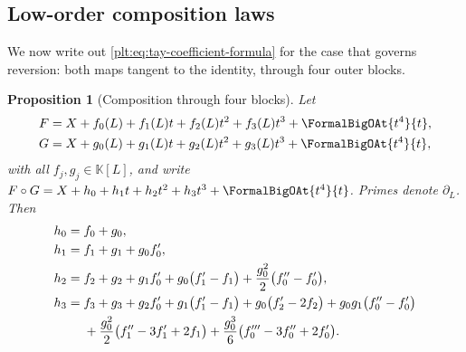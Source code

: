 \documentclass[11pt,oneside]{article}
\theoremstyle{plain}
\newtheorem{proposition}[theorem]{Proposition}
\theoremstyle{definition}
\theoremstyle{remark}
\newcommand{\K}{\mathbb{K}}
\newcommand{\compose}{\mathbin{\circ}}
\begin{document}
\subsection{Low-order composition laws}
\label{plt:sec:tay-low-order}

We now write out \eqref{plt:eq:tay-coefficient-formula} for the case that
governs reversion: both maps tangent to the identity, through four outer
blocks.

\begin{proposition}[Composition through four blocks]
\label{plt:prop:tay-four-blocks}
Let
\begin{align}
 F&=X+f_{0}(L)+f_{1}(L)t+f_{2}(L)t^{2}+f_{3}(L)t^{3}
    +\FormalBigOAt{t^{4}}{t},
 \label{plt:eq:tay-F-blocks}\\
 G&=X+g_{0}(L)+g_{1}(L)t+g_{2}(L)t^{2}+g_{3}(L)t^{3}
    +\FormalBigOAt{t^{4}}{t},
 \label{plt:eq:tay-G-blocks}
\end{align}
with all \(f_{j},g_{j}\in\K[L]\), and write
\(F\compose G=X+h_{0}+h_{1}t+h_{2}t^{2}+h_{3}t^{3}+\FormalBigOAt{t^{4}}{t}\).
Primes denote \(\partial_L\).  Then
\begin{align}
 h_{0}={}&f_{0}+g_{0},\label{plt:eq:tay-h0}\\
 h_{1}={}&f_{1}+g_{1}+g_{0}f_{0}',\label{plt:eq:tay-h1}\\
 h_{2}={}&f_{2}+g_{2}+g_{1}f_{0}'+g_{0}\bigl(f_{1}'-f_{1}\bigr)
   +\frac{g_{0}^{2}}{2}\bigl(f_{0}''-f_{0}'\bigr),\label{plt:eq:tay-h2}\\
 h_{3}={}&f_{3}+g_{3}+g_{2}f_{0}'+g_{1}\bigl(f_{1}'-f_{1}\bigr)
   +g_{0}\bigl(f_{2}'-2f_{2}\bigr)
   +g_{0}g_{1}\bigl(f_{0}''-f_{0}'\bigr)\notag\\
 &{}+\frac{g_{0}^{2}}{2}\bigl(f_{1}''-3f_{1}'+2f_{1}\bigr)
   +\frac{g_{0}^{3}}{6}\bigl(f_{0}'''-3f_{0}''+2f_{0}'\bigr).
 \label{plt:eq:tay-h3}
\end{align}
\end{proposition}
\end{document}
